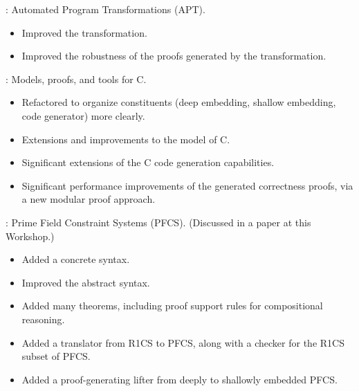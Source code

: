 
\begin{frame}

\implibtitle

:
Automated Program Transformations (APT).
\begin{itemize}
\item Improved the  transformation.
\item Improved the robustness of the proofs
      generated by the  transformation.
\end{itemize}

\end{frame}


\begin{frame}

\implibtitle

:
Models, proofs, and tools for C.
\begin{itemize}
\item Refactored to organize constituents
      (deep embedding, shallow embedding, code generator)
      more clearly.
\item Extensions and improvements to the model of C.
\item Significant extensions of the C code generation capabilities.
\item Significant performance improvements of the generated correctness proofs,
      via a new modular proof approach.
\end{itemize}

\end{frame}


\begin{frame}

\implibtitle

:
Prime Field Constraint Systems (PFCS).
(Discussed in a paper at this Workshop.)
\begin{itemize}
\item Added a concrete syntax.
\item Improved the abstract syntax.
\item Added many theorems,
      including proof support rules for compositional reasoning.
\item Added a translator from R1CS to PFCS,
      along with a checker for the R1CS subset of PFCS.
\item Added a proof-generating lifter from deeply to shallowly embedded PFCS.
\end{itemize}

\end{frame}

